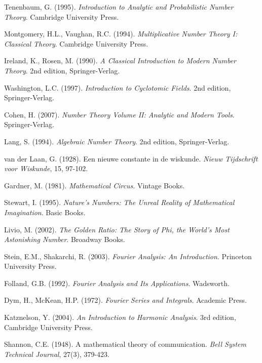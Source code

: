 \documentclass[12pt]{article}
\theoremstyle{plain}
\theoremstyle{definition}
\begin{document}
\begin{thebibliography}{99}
 Tenenbaum, G. (1995). \emph{Introduction to Analytic and Probabilistic Number Theory}. Cambridge University Press.

 Montgomery, H.L., Vaughan, R.C. (1994). \emph{Multiplicative Number Theory I: Classical Theory}. Cambridge University Press.

 Ireland, K., Rosen, M. (1990). \emph{A Classical Introduction to Modern Number Theory}. 2nd edition, Springer-Verlag.

 Washington, L.C. (1997). \emph{Introduction to Cyclotomic Fields}. 2nd edition, Springer-Verlag.

 Cohen, H. (2007). \emph{Number Theory Volume II: Analytic and Modern Tools}. Springer-Verlag.

 Lang, S. (1994). \emph{Algebraic Number Theory}. 2nd edition, Springer-Verlag.

 van der Laan, G. (1928). Een nieuwe constante in de wiskunde. \emph{Nieuw Tijdschrift voor Wiskunde}, 15, 97-102.

 Gardner, M. (1981). \emph{Mathematical Circus}. Vintage Books.

 Stewart, I. (1995). \emph{Nature's Numbers: The Unreal Reality of Mathematical Imagination}. Basic Books.

 Livio, M. (2002). \emph{The Golden Ratio: The Story of Phi, the World's Most Astonishing Number}. Broadway Books.

 Stein, E.M., Shakarchi, R. (2003). \emph{Fourier Analysis: An Introduction}. Princeton University Press.

 Folland, G.B. (1992). \emph{Fourier Analysis and Its Applications}. Wadsworth.

 Dym, H., McKean, H.P. (1972). \emph{Fourier Series and Integrals}. Academic Press.

 Katznelson, Y. (2004). \emph{An Introduction to Harmonic Analysis}. 3rd edition, Cambridge University Press.

 Shannon, C.E. (1948). A mathematical theory of communication. \emph{Bell System Technical Journal}, 27(3), 379-423.


\end{thebibliography}
\end{document}

